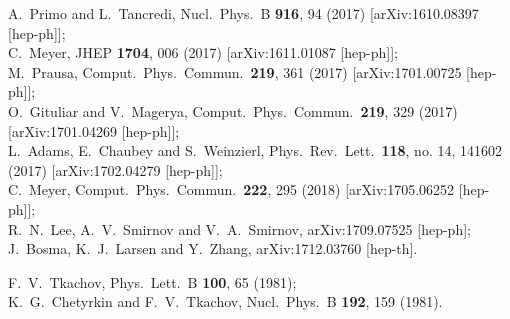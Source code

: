 \documentclass[aps,prd,preprint,groupedaddress,nofootinbib,showpacs,eqsecnum]{revtex4}
\begin{document}
\begin{thebibliography}{99}
A.~Primo and L.~Tancredi,
Nucl.\ Phys.\ B {\bf 916}, 94 (2017)
[arXiv:1610.08397 [hep-ph]];\\
C.~Meyer,
JHEP {\bf 1704}, 006 (2017)
[arXiv:1611.01087 [hep-ph]];\\
M.~Prausa,
Comput.\ Phys.\ Commun.\  {\bf 219}, 361 (2017)
[arXiv:1701.00725 [hep-ph]];\\
O.~Gituliar and V.~Magerya,
Comput.\ Phys.\ Commun.\  {\bf 219}, 329 (2017)
[arXiv:1701.04269 [hep-ph]];\\
L.~Adams, E.~Chaubey and S.~Weinzierl,
Phys.\ Rev.\ Lett.\  {\bf 118}, no. 14, 141602 (2017)
[arXiv:1702.04279 [hep-ph]];\\
C.~Meyer,
Comput.\ Phys.\ Commun.\  {\bf 222}, 295 (2018)
[arXiv:1705.06252 [hep-ph]];\\
R.~N.~Lee, A.~V.~Smirnov and V.~A.~Smirnov,
arXiv:1709.07525 [hep-ph];\\
J.~Bosma, K.~J.~Larsen and Y.~Zhang,
arXiv:1712.03760 [hep-th].

F.~V.~Tkachov,
Phys.\ Lett.\ B {\bf 100}, 65 (1981); \\
K.~G.~Chetyrkin and F.~V.~Tkachov,
Nucl.\ Phys.\ B {\bf 192}, 159 (1981).


\end{thebibliography}
\end{document}
